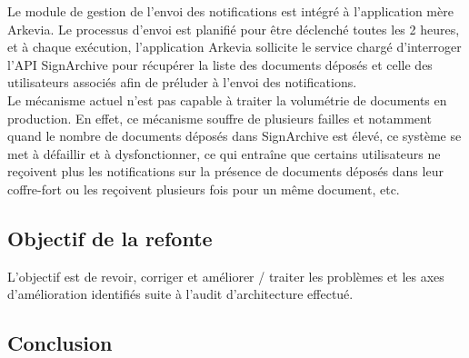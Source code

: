 Le module de gestion de l'envoi des notifications est intégré à l'application mère Arkevia. Le processus d'envoi est planifié pour être déclenché toutes les 2 heures, et à chaque exécution, l'application Arkevia sollicite le service chargé d'interroger l'API SignArchive pour récupérer la liste des documents déposés et celle des utilisateurs associés afin de préluder à l'envoi des notifications.\\

Le mécanisme actuel n'est pas capable à traiter la volumétrie de documents en production. En effet, ce mécanisme souffre de plusieurs failles et notamment quand le nombre de documents déposés dans SignArchive est élevé, ce système se met à défaillir et à dysfonctionner, ce qui entraîne que certains utilisateurs ne reçoivent plus les notifications sur la présence de documents déposés dans leur coffre-fort ou les reçoivent plusieurs fois pour un même document, etc. 

\subsection{Objectif de la refonte}
L'objectif est de revoir, corriger et améliorer / traiter les problèmes et les axes d'amélioration identifiés suite à l'audit d'architecture effectué.
\subsection*{Conclusion}

